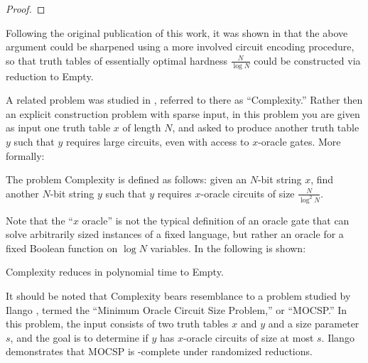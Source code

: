 \begin{proof}

\end{proof}

Following the original publication of this work, it was shown in \cite{CHR} that the above argument could be sharpened using a more involved circuit encoding procedure, so that truth tables of essentially optimal hardness $\frac{N}{\log N}$ could be constructed via reduction to {\sc Empty}.

A related problem was studied in \cite{total}, referred to there as ``{\sc Complexity}.'' Rather then an explicit construction problem with sparse input, in this problem you are given as input one truth table $x$ of length $N$, and asked to produce another truth table $y$ such that $y$ requires large circuits, even with access to $x$-oracle gates. More formally:

\begin{definition}\label{def:complexity}
The problem {\sc Complexity} is defined as follows: given an $N$-bit string $x$, find another $N$-bit string $y$ such that $y$ requires $x$-oracle circuits of size $\frac{N}{\log^2 N}$.
\end{definition}
Note that the ``$x$ oracle'' is not the typical definition of an oracle gate that can solve arbitrarily sized instances of a fixed language, but rather an oracle for a fixed Boolean function on $\log N$ variables.
In \cite{total} the following is shown:
\begin{theorem}
{\sc Complexity} reduces in polynomial time to {\sc Empty}.
\end{theorem}
It should be noted that {\sc Complexity} bears resemblance to a problem studied by Ilango \cite{Ilango}, termed the ``Minimum Oracle Circuit Size Problem,'' or ``MOCSP.'' In this problem, the input consists of two truth tables $x$ and $y$ and a size parameter $s$, and the goal is to determine if $y$ has $x$-oracle circuits of size at most $s$. Ilango demonstrates that MOCSP is -complete under randomized reductions.

